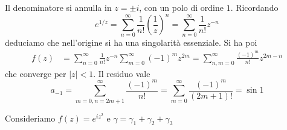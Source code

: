 \Soluzione

Il denominatore si annulla in $z = \pm i$, con un polo di ordine $1$. Ricordando
\begin{equation*}
e^{1/z} = \sum\limits^{\infty}_{n = 0}\frac{1}{n!}\left(\frac{1}{z}\right)^{n} = \sum\limits^{\infty}_{n = 0}\frac{1}{n!} z^{- n}
\end{equation*}
deduciamo che nell'origine si ha una singolarità essenziale. Si ha poi
\begin{align*}
f(z) & = \sum\limits^{\infty}_{n = 0}\frac{1}{n!} z^{- n}\sum\limits^{\infty}_{m = 0}\left(- 1\right)^{m} z^{2m} = \sum\limits^{\infty}_{n, m = 0}\frac{\left(- 1\right)^{m}}{n!} z^{2m - n}
\end{align*}
che converge per $\left| z\right| < 1$. Il residuo vale
\begin{equation*}
a_{- 1} = \sum\limits^{\infty}_{m = 0, n = 2m + 1}\frac{\left(- 1\right)^{m}}{n!} = \sum\limits^{\infty}_{m = 0}\frac{\left(- 1\right)^{m}}{\left(2m + 1\right) !} = \sin 1
\end{equation*}

\Soluzione

Consideriamo $f(z) = e^{iz^{2}}$ e $\gamma = \gamma_{1} + \gamma_{2} + \gamma_{3}$


